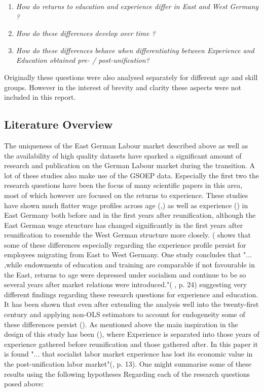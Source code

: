 \begin{enumerate}
		\item \textit{How do returns to education and experience differ in East and West Germany ?} 
	\item \textit{How do these differences develop over time ?}
	\item \textit{How do these differences behave when differentiating between Experience and Education obtained pre- / post-unification?}
\end{enumerate}

Originally these questions were also analysed separately for different age and skill groups. However in the interest of brevity and clarity these aspects were not included in this report. 


\subsection{Literature Overview}
The uniqueness of the East German Labour market described above as well as the availability of high quality datasets have sparked a significant amount of research and publication on the German Labour market during the transition. A lot of these studies also make use of the GSOEP data.
Especially the first two the research questions have been the focus of many scientific papers in this area, most of which however are focused on the returns to experience. These studies have shown much flatter wage profiles across age  (\cite{krueger_comparative_1992},\cite{burda_getting_1997}) as well as experience (\cite{jurajda_when_2007}) in East Germany both before and in the first years after reunification, although the East German wage structure has changed significantly in the first years after reunification to resemble the West German structure more closely. (\cite{krueger_comparative_1992} shows that some of these differences especially regarding the experience profile persist for employees migrating from East to West Germany.
One study concludes that "... ,while endowments of education and training are comparable if not favourable in the East, returns to age were depressed under socialism and continue to be so several years after market relations were introduced."(\cite{burda_getting_1997}
, p. 24) suggesting very different findings regarding these research questions for experience and education. It has been shown that even after extending the analysis well into the twenty-first century and applying non-OLS estimators to account for endogeneity some of these differences persist (\cite{orlowski_east_2009}).
As mentioned above the main inspiration in the design of this study has been (\cite{gathmann_understanding_2004}), where Experience is separated into those years of experience gathered before reunification and those gathered after. In this paper it is found "... that socialist labor market experience has lost its economic value in the post-unification
labor market"(\cite{gathmann_understanding_2004}, p. 13).
One might summarise some of these results using the following hypotheses Regarding each of the research questions posed above:

